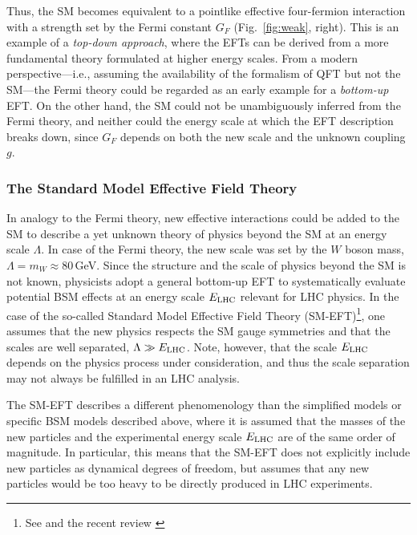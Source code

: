 Thus, the SM becomes equivalent to a pointlike effective four-fermion interaction with a strength set by the Fermi constant $G_F$ (Fig.~\ref{fig:weak}, right). 
This is an example of a \textit{top-down approach}, where the EFTs can be derived from a more fundamental theory formulated at higher energy scales.
From a modern perspective---i.e., assuming the availability of the formalism of QFT but not the SM---the Fermi theory could be regarded as an
early example for a \textit{bottom-up} EFT. 
On the other hand, the SM could not be unambiguously inferred from the Fermi theory, and neither
could the energy scale at which the EFT description breaks down, since $G_F$ depends 
on both the new scale and the unknown coupling $g$. 


\subsubsection{The Standard Model Effective Field Theory} \label{sec:smeftphysics}


In analogy to the Fermi theory, new effective interactions could be added
to the SM to describe a yet unknown theory of physics beyond the SM at
an energy scale $\Lambda$. In case of the Fermi theory, the new scale
was set by the $W$ boson mass, $\Lambda = m_W \approx 80$\,GeV. Since the structure and the
scale of physics beyond the
SM is not known, physicists adopt a
general bottom-up EFT to systematically evaluate potential BSM
effects at an energy scale $E_{\rm LHC}$  relevant for LHC physics. In the case of the
so-called 
Standard Model Effective Field Theory (SM-EFT)\footnote{See \cite{Buchmuller:1985jz,Grzadkowski:2010es} and the recent review
\cite{Brivio:2017vri}}, one assumes that the
new physics respects the SM gauge symmetries and that the scales are
well separated, $\Lambda\gg E_{\rm LHC}$. Note, however, that the
scale $E_{\rm LHC}$ depends on the physics process under
consideration, and thus the scale separation may not always be fulfilled in an LHC analysis. 

The SM-EFT describes a different phenomenology than the simplified
models or specific BSM models described above, where it is assumed that the masses of the new
particles and the experimental energy scale $E_{\rm LHC}$ are of the same
order of magnitude. In particular, this means that the SM-EFT does not
explicitly include new particles as dynamical degrees of freedom, but
assumes that any new particles would be too heavy to be directly produced in LHC experiments. 


